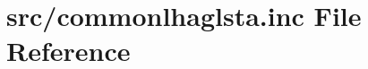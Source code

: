\hypertarget{commonlhaglsta_8inc}{}\section{src/commonlhaglsta.inc File Reference}
\label{commonlhaglsta_8inc}
